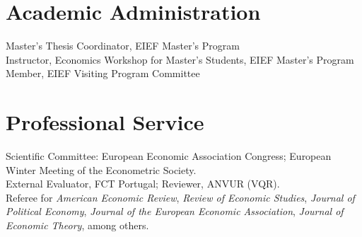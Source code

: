 \documentclass[11pt]{article}
\begin{document}
\section{Academic Administration}
Master's Thesis Coordinator, EIEF Master's Program\\
Instructor, Economics Workshop for Master's Students, EIEF Master's Program\\
Member, EIEF Visiting Program Committee

\section{Professional Service}
Scientific Committee: European Economic Association Congress; European Winter Meeting of the Econometric Society.\\
External Evaluator, FCT Portugal; Reviewer, ANVUR (VQR).\\
Referee for \emph{American Economic Review}, \emph{Review of Economic Studies}, \emph{Journal of Political Economy}, \emph{Journal of the European Economic Association}, \emph{Journal of Economic Theory}, among others.
\end{document}
